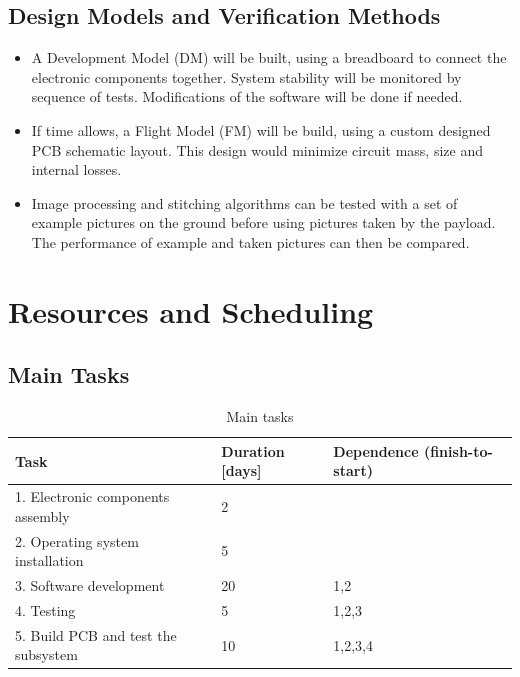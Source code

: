 \documentclass[fontsize=11pt,paper=a4,]{scrartcl}
\begin{document}
\subsection{Design Models and Verification Methods}
\begin{itemize}
\item A Development Model (DM) will be built, using a breadboard to connect the electronic components together. System stability will be monitored by sequence of tests. Modifications of the software will be done if needed.
\item If time allows, a Flight Model (FM) will be build, using a custom designed PCB schematic layout. This design would minimize circuit mass, size and internal losses.
\item {\color{red} Image processing and stitching algorithms can be tested with a set of example pictures on the ground before using pictures taken by the payload. The performance of example and taken pictures can then be compared.}
\end{itemize}


\section{Resources and Scheduling}
\subsection{Main Tasks}
\begin{table}[htbp!]
\centering
\caption{Main tasks}
\label{tab:main_tasks}
\begin{tabular}{| l | l | l |} \hline
Task & Duration [days] & Dependence (finish-to-start) \\ \hline
1. Electronic components assembly & 2 & \\ \hline
2. Operating system installation & 5 & \\ \hline
3. Software development & 20 & 1,2 \\ \hline
4. Testing & 5 & 1,2,3 \\ \hline
5. Build PCB and test the subsystem & 10 & 1,2,3,4 \\ \hline
\end{tabular}
\vspace{-1.0em}
\end{table}
\end{document}
